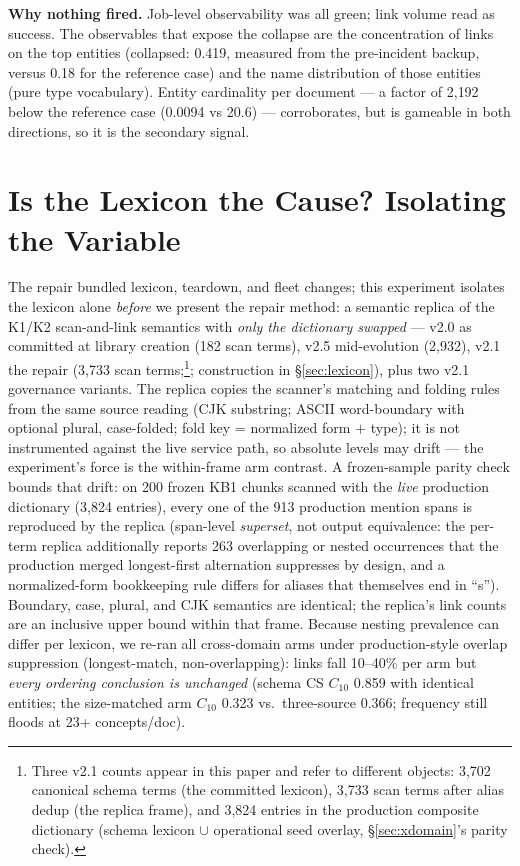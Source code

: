 \documentclass[sigconf,nonacm,anonymous]{acmart}
\begin{document}
\textbf{Why nothing fired.} Job-level observability was all green; link
volume read as success. The observables that expose the collapse are the
concentration of links on the top entities (collapsed: 0.419, measured
from the pre-incident backup, versus 0.18 for the reference case) and
the name distribution of those entities (pure type vocabulary). Entity
cardinality per document --- a factor of 2{,}192 below the reference
case (0.0094 vs 20.6) --- corroborates, but is gameable in both
directions, so it is the secondary signal.

\section{Is the Lexicon the Cause? Isolating the Variable}\label{sec:iso}

The repair bundled lexicon, teardown, and fleet changes; this experiment
isolates the lexicon alone \emph{before} we present the repair method:
a semantic replica of the K1/K2 scan-and-link semantics with \emph{only
the dictionary swapped} --- v2.0 as committed at library creation (182
scan terms), v2.5 mid-evolution (2{,}932), v2.1 the repair (3{,}733 scan terms;\footnote{Three
v2.1 counts appear in this paper and refer to different objects:
3{,}702 canonical schema terms (the committed lexicon), 3{,}733 scan
terms after alias dedup (the replica frame), and 3{,}824 entries in the
production composite dictionary (schema lexicon $\cup$ operational
seed overlay, \S\ref{sec:xdomain}'s parity check).};
construction in \S\ref{sec:lexicon}), plus two v2.1 governance variants.
The replica copies the scanner's matching and folding rules from the
same source reading (CJK substring; ASCII word-boundary with optional
plural, case-folded; fold key = normalized form $+$ type); it is not
instrumented against the live service path, so absolute levels may
drift --- the experiment's force is the within-frame arm contrast. A
frozen-sample parity check bounds that drift: on 200 frozen KB1 chunks
scanned with the \emph{live} production dictionary (3{,}824 entries),
every one of the 913 production mention spans is reproduced by the
replica (span-level \emph{superset}, not output equivalence: the
per-term replica additionally reports 263 overlapping or nested
occurrences that the production merged longest-first alternation
suppresses by design, and a normalized-form bookkeeping rule differs
for aliases that themselves end in ``s''). Boundary, case, plural, and
CJK semantics are identical; the replica's link counts are an
inclusive upper bound within that frame. Because nesting prevalence
can differ per lexicon, we re-ran all cross-domain arms under
production-style overlap suppression (longest-match, non-overlapping):
links fall 10--40\% per arm but \emph{every ordering conclusion is
unchanged} (schema CS $C_{10}$ 0.859 with identical entities; the
size-matched arm $C_{10}$ 0.323 vs.\ three-source 0.366; frequency
still floods at 23+ concepts/doc).
\end{document}

